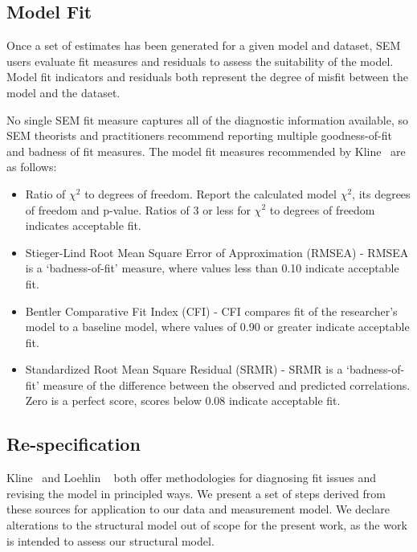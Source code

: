 \subsection{Model Fit}
Once a set of estimates has been generated for a given model and dataset, SEM users evaluate fit measures and residuals to assess the suitability of the model. Model fit indicators and residuals both represent the degree of misfit between the model and the dataset. 

No single SEM fit measure captures all of the diagnostic information available, so SEM theorists and practitioners recommend reporting multiple goodness-of-fit and badness of fit measures.
The model fit measures recommended by Kline~\cite{kline2015principles} are as follows:
\begin{itemize}
	\item Ratio of $\chi^2$ to degrees of freedom. Report the calculated model $\chi^2$, its degrees of freedom and p-value. Ratios of 3 or less for $\chi^2$ to degrees of freedom indicates acceptable fit.
	\item Stieger-Lind Root Mean Square Error of Approximation (RMSEA) - RMSEA is a `badness-of-fit' measure, where values less than 0.10 indicate acceptable fit.
	\item Bentler Comparative Fit Index (CFI) - CFI compares fit of the researcher's model to a baseline model, where values of 0.90 or greater indicate acceptable fit.
	\item Standardized Root Mean Square Residual (SRMR) - SRMR is a `badness-of-fit' measure of the difference between the observed and predicted correlations. Zero is a perfect score, scores below 0.08 indicate acceptable fit.
\end{itemize}

\subsection{Re-specification}
Kline~\cite{kline2015principles} and Loehlin ~\cite{loehlin2004principles} both offer methodologies for diagnosing fit issues and revising the model in principled ways. We present a set of steps derived from these sources for application to our data and measurement model. We declare alterations to the structural model out of scope for the present work, as the work is intended to assess our structural model. 

